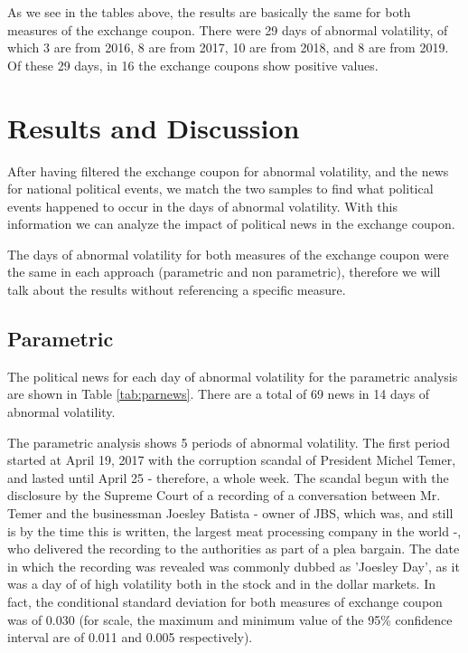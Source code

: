 \documentclass[cic,tc, english]{iiufrgs}
\begin{document}
    

    

    As we see in the tables above, the results are basically the same for both measures of the exchange coupon. There were 29 days of abnormal volatility, of which 3 are from 2016, 8 are from 2017, 10 are from 2018, and 8 are from 2019. Of these 29 days, in 16 the exchange coupons show positive values.

\chapter{Results and Discussion} \label{chapter_results_discussion}

    After having filtered the exchange coupon for abnormal volatility, and the news for national political events, we match the two samples to find what political events happened to occur in the days of abnormal volatility. With this information we can analyze the impact of political news in the exchange coupon.

    The days of abnormal volatility for both measures of the exchange coupon were the same in each approach (parametric and non parametric), therefore we will talk about the results without referencing a specific measure.

\section{Parametric}

    The political news for each day of abnormal volatility for the parametric analysis are shown in Table \ref{tab:parnews}. There are a total of 69 news in 14 days of abnormal volatility.

    

    The parametric analysis shows 5 periods of abnormal volatility. The first period started at April 19, 2017 with the corruption scandal of President Michel Temer, and lasted until April 25 - therefore, a whole week. The scandal begun with the disclosure by the Supreme Court of a recording of a conversation between Mr. Temer and the businessman Joesley Batista - owner of JBS, which was, and still is by the time this is written, the largest meat processing company in the world -, who delivered the recording to the authorities as part of a plea bargain. The date in which the recording was revealed was commonly dubbed as 'Joesley Day', as it was a day of of high volatility both in the stock and in the dollar markets. In fact, the conditional standard deviation for both measures of exchange coupon was of 0.030 (for scale, the maximum and minimum value of the 95\% confidence interval are of 0.011 and 0.005 respectively).
\end{document}
